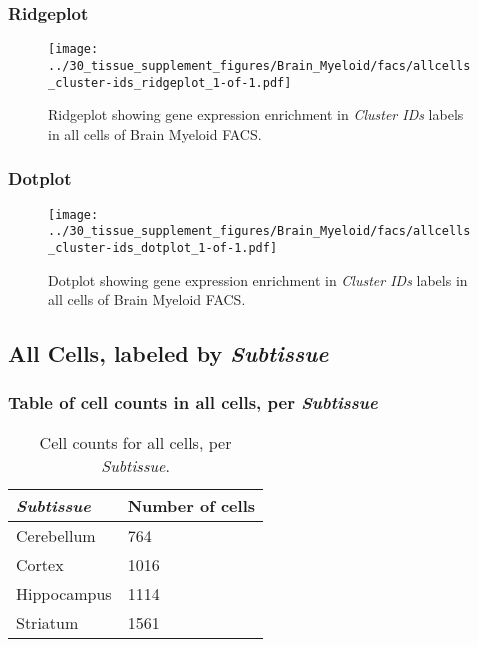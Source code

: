 \clearpage

\subsubsection{Ridgeplot}
\begin{figure}[h]
\centering
\texttt{[image: ../30\_tissue\_supplement\_figures/Brain\_Myeloid/facs/allcells\_cluster-ids\_ridgeplot\_1-of-1.pdf]}

\caption{ Ridgeplot  showing gene expression enrichment in \emph{Cluster IDs} labels in all cells of Brain Myeloid FACS. }
\end{figure}


\clearpage

\subsubsection{Dotplot}
\begin{figure}[h]
\centering
\texttt{[image: ../30\_tissue\_supplement\_figures/Brain\_Myeloid/facs/allcells\_cluster-ids\_dotplot\_1-of-1.pdf]}

\caption{ Dotplot  showing gene expression enrichment in \emph{Cluster IDs} labels in all cells of Brain Myeloid FACS. }
\end{figure}


\clearpage

\subsection{All Cells, labeled by \emph{Subtissue}}
\subsubsection{Table of cell counts in all cells, per \emph{Subtissue}}\begin{table}[h]
\centering
\label{my-label}
\begin{tabular}{@{}ll@{}}
\toprule

\emph{Subtissue}& Number of cells \\ \midrule
Cerebellum & 764 \\

Cortex & 1016 \\

Hippocampus & 1114 \\

Striatum & 1561 \\
\bottomrule
\end{tabular}
\caption{Cell counts for all cells, per \emph{Subtissue}.}
\end{table}

